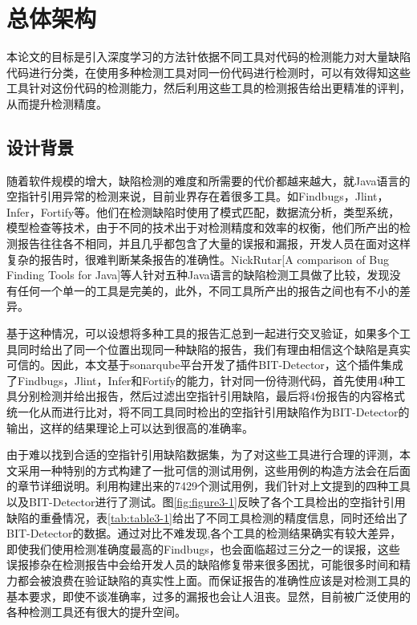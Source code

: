 \chapter{总体架构}
本论文的目标是引入深度学习的方法针依据不同工具对代码的检测能力对大量缺陷代码进行分类，在使用多种检测工具对同一份代码进行检测时，可以有效得知这些工具针对这份代码的检测能力，然后利用这些工具的检测报告给出更精准的评判，从而提升检测精度。
\section{设计背景}
随着软件规模的增大，缺陷检测的难度和所需要的代价都越来越大，就Java语言的空指针引用异常的检测来说，目前业界存在着很多工具。如Findbugs，Jlint，Infer，Fortify等。他们在检测缺陷时使用了模式匹配，数据流分析，类型系统，模型检查等技术，由于不同的技术出于对检测精度和效率的权衡，他们所产出的检测报告往往各不相同，并且几乎都包含了大量的误报和漏报，开发人员在面对这样复杂的报告时，很难判断某条报告的准确性。NickRutar[A comparison of Bug Finding Tools for Java]等人针对五种Java语言的缺陷检测工具做了比较，发现没有任何一个单一的工具是完美的，此外，不同工具所产出的报告之间也有不小的差异。

基于这种情况，可以设想将多种工具的报告汇总到一起进行交叉验证，如果多个工具同时给出了同一个位置出现同一种缺陷的报告，我们有理由相信这个缺陷是真实可信的。因此，本文基于sonarqube平台开发了插件BIT-Detector，这个插件集成了Findbugs，Jlint，Infer和Fortify的能力，针对同一份待测代码，首先使用4种工具分别检测并给出报告，然后过滤出空指针引用缺陷，最后将4份报告的内容格式统一化从而进行比对，将不同工具同时检出的空指针引用缺陷作为BIT-Detector的输出，这样的结果理论上可以达到很高的准确率。

由于难以找到合适的空指针引用缺陷数据集，为了对这些工具进行合理的评测，本文采用一种特别的方式构建了一批可信的测试用例，这些用例的构造方法会在后面的章节详细说明。利用构建出来的7429个测试用例，我们针对上文提到的四种工具以及BIT-Detector进行了测试。图\ref{fig:figure3-1}反映了各个工具检出的空指针引用缺陷的重叠情况，表\ref{tab:table3-1}给出了不同工具检测的精度信息，同时还给出了BIT-Detector的数据。通过对比不难发现,各个工具的检测结果确实有较大差异，即使我们使用检测准确度最高的Findbugs，也会面临超过三分之一的误报，这些误报掺杂在检测报告中会给开发人员的缺陷修复带来很多困扰，可能很多时间和精力都会被浪费在验证缺陷的真实性上面。而保证报告的准确性应该是对检测工具的基本要求，即使不谈准确率，过多的漏报也会让人沮丧。显然，目前被广泛使用的各种检测工具还有很大的提升空间。

